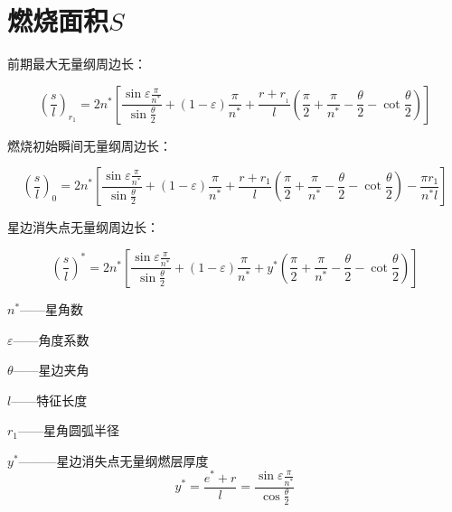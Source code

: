 \section{燃烧面积$S$}
前期最大无量纲周边长：

\begingroup
\fontsize{16}{14}\selectfont 
\[\left( \frac{s}{l} \right) _{r_1}=2n^*\left[ \frac{\sin \varepsilon \frac{\pi}{n^*}}{\sin \frac{\theta}{2}}+(1-\varepsilon )\frac{\pi}{n^*}+\frac{r+r_{_1}}{l}\left( \frac{\pi}{2}+\frac{\pi}{n^*}-\frac{\theta}{2}-\cot \frac{\theta}{2} \right) \right] 
\]
\endgroup

\vspace{1em}
燃烧初始瞬间无量纲周边长：

\begingroup
\fontsize{16}{14}\selectfont 
\[\left( \frac{s}{l} \right) _0=2n^*\left[ \frac{\sin \varepsilon \frac{\pi}{n^*}}{\sin \frac{\theta}{2}}+(1-\varepsilon )\frac{\pi}{n^*}+\frac{r+r_1}{l}\left( \frac{\pi}{2}+\frac{\pi}{n^*}-\frac{\theta}{2}-\cot \frac{\theta}{2} \right) -\frac{\pi r_1}{n^*l} \right] 
\]
\endgroup
\vspace{1em}

星边消失点无量纲周边长：

\begingroup
\fontsize{16}{14}\selectfont 
\[
\left( \frac{s}{l} \right) ^*=2n^*\left[ \frac{\sin \varepsilon \frac{\pi}{n^*}}{\sin \frac{\theta}{2}}+(1-\varepsilon )\frac{\pi}{n^*}+y^*\left( \frac{\pi}{2}+\frac{\pi}{n^*}-\frac{\theta}{2}-\cot \frac{\theta}{2} \right) \right] 
\]
\endgroup
\vspace{1em}

$n^*$——星角数

$\varepsilon$——角度系数

$\theta$——星边夹角

$l$——特征长度

$r_{1}$——星角圆弧半径

$y^*$———星边消失点无量纲燃层厚度
\begingroup
\fontsize{16}{14}\selectfont 
\[
y^*=\frac{e^*+r}{l}=\frac{\sin \varepsilon \frac{\pi}{n^*}}{\cos \frac{\theta}{2}}
\]
\endgroup